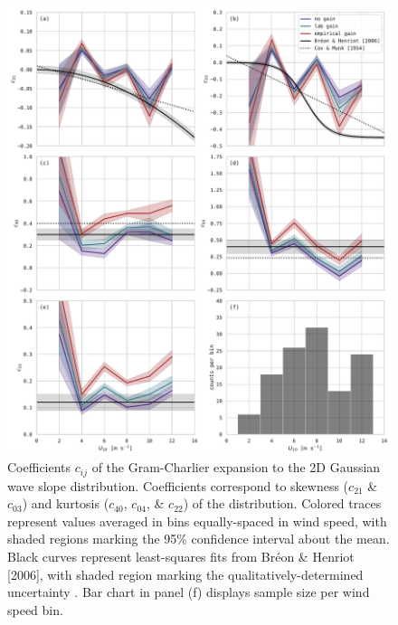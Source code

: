\documentclass[letterpaper,journal]{IEEEtran}
\begin{document}
\begin{figure}[!ht]
    \centering
    \includegraphics[width=\textwidth]{_figures/slope_distribution_GC_coeffs.pdf}
    \vspace{-20pt}
\caption{Coefficients $c_{ij}$ of the Gram-Charlier expansion to the 2D Gaussian wave slope distribution. Coefficients correspond to skewness ($c_{21}$ \& $c_{03}$) and kurtosis ($c_{40}$, $c_{04}$, \& $c_{22}$) of the distribution. Colored traces represent values averaged in bins equally-spaced in wind speed, with shaded regions marking the 95\% confidence interval about the mean. Black curves represent least-squares fits from Br\'eon \& Henriot [2006], with shaded region marking the qualitatively-determined uncertainty \cite{Breon2006}. Bar chart in panel (f) displays sample size per wind speed bin.}
\label{fig:slope_distribution_GC_coeffs}
\end{figure}

\newpage

~\clearpage
\end{document}
